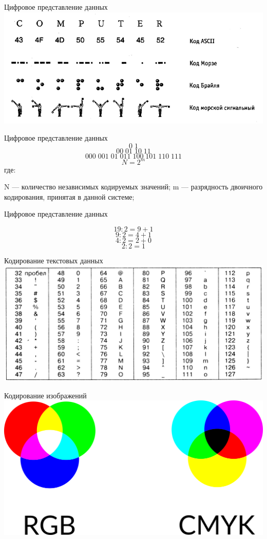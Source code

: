 \documentclass[10pt,pdf,hyperref={unicode}]{beamer}%
\begin{document}
\begin{frame}{Цифровое представление данных}
  \includegraphics[width=\textwidth]{p1.png}
\end{frame}


\begin{frame}{Цифровое представление данных}
  $$0\;1$$
  $$00\; 01\; 10\; 11$$
  $$000\; 001\; 01\; 011\; 100\; 101\; 110\; 111$$
    $$N=2^{m}$$
  где:

  N --- количество независимых кодируемых значений;
  m --- разрядность двоичного кодирования, принятая в данной системе;

\end{frame}

\begin{frame}{Цифровое представление данных}

$$19:2 = 9+1$$
$$9 : 2 = 4 + 1$$
$$4 : 2 = 2 + 0$$
$$2:2 = 1$$
\end{frame}

\begin{frame}{Кодирование текстовых данных}
   \includegraphics[width=\textwidth]{p2.png}
\end{frame}

\begin{frame}{Кодирование изображений}
  \includegraphics[width=\textwidth]{p3.png}
\end{frame}
\end{document}
